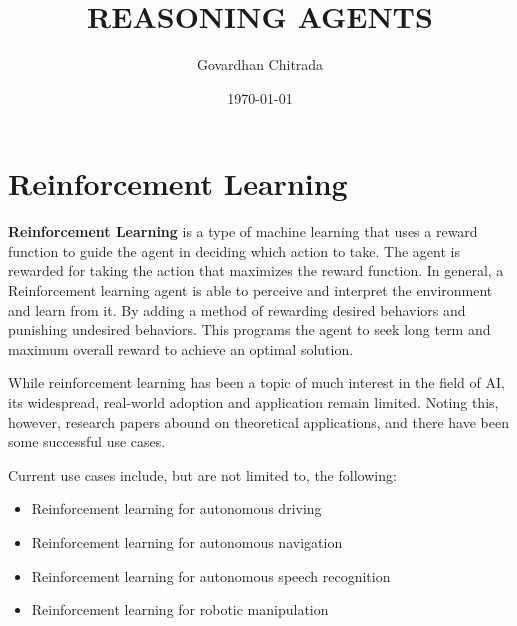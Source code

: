\documentclass[11pt]{article}
\title{ REASONING AGENTS }
\author{ Govardhan Chitrada }
\date{\today}
\begin{document}
\maketitle	
\pagebreak



\section{Reinforcement Learning}


\textbf{Reinforcement Learning} is a type of machine learning that uses a reward function to guide the agent in deciding which action to take. The agent is rewarded for taking the action that maximizes the reward function.
In general, a Reinforcement learning agent is able to perceive and interpret the environment and learn from it. By adding a method of rewarding desired behaviors and punishing undesired behaviors. This programs the agent to 
seek long term and maximum overall reward to achieve an optimal solution.

While reinforcement learning has been a topic of much interest in the field of AI, its widespread, real-world adoption and application remain limited. Noting this, however, research papers abound on theoretical applications, 
and there have been some successful use cases.

Current use cases include, but are not limited to, the following:
\begin{itemize}
    \item Reinforcement learning for autonomous driving
    \item  Reinforcement learning for autonomous navigation
    \item  Reinforcement learning for autonomous speech recognition
    \item Reinforcement learning for robotic manipulation
\end{itemize}
\end{document}
